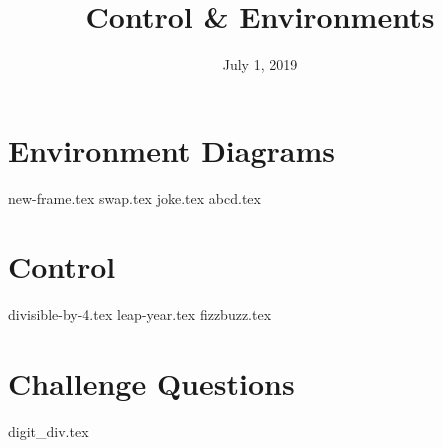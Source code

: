 \documentclass{exam}
\title{Control \& Environments}
\date{July 1, 2019}
\begin{document}
\maketitle
\section{Environment Diagrams}
\begin{questions}
{new-frame.tex}
{swap.tex}
\newpage
{joke.tex}
{abcd.tex}
\end{questions}

\section{Control}
\begin{questions}
{divisible-by-4.tex}
{leap-year.tex}
{fizzbuzz.tex}
\end{questions}

\newpage
\section{Challenge Questions}
\begin{questions}
{digit_div.tex}
\end{questions}
\end{document}
